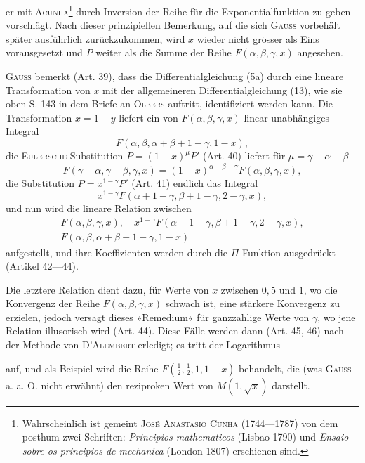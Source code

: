 er mit \textsc{Acunha}\footnote{Wahrscheinlich ist gemeint \textsc{José Anastasio Cunha} (1744—1787) von dem posthum zwei Schriften: \textit{Principios mathematicos} (Lisbao 1790) und \textit{Ensaio sobre os principios de mechanica} (London 1807) erschienen sind.} durch Inversion der Reihe für die Exponentialfunktion
zu geben vorschlägt. Nach dieser prinzipiellen Bemerkung, auf die sich \textsc{Gauss}
vorbehält später ausführlich zurückzukommen, wird \(x\) wieder nicht grösser als
Eins vorausgesetzt und \(P\) weiter als die Summe der Reihe \(F(\alpha,\beta,\gamma,x)\) angesehen.
\par
\textsc{Gauss} bemerkt (Art. 39), dass die Differentialgleichung (5a) durch eine
lineare Transformation von \(x\) mit der allgemeineren Differentialgleichung (13),
wie sie oben S. 143 in dem Briefe an \textsc{Olbers} auftritt, identifiziert werden
kann. Die Transformation \(x=1-y\) liefert ein von \(F(\alpha,\beta,\gamma,x)\) linear unabhängiges
Integral
\[
F(\alpha,\beta,\alpha+\beta+1-\gamma,1-x),
\]
die \textsc{Eulersche} Substitution \(P=(1-x)^\mu P'\) (Art. 40) liefert für \(\mu=\gamma-\alpha-\beta\)
\[
F(\gamma-\alpha,\gamma-\beta,\gamma,x)=(1-x)^{\alpha+\beta-\gamma}F(\alpha,\beta,\gamma,x),
\]
die Substitution \(P=x^{1-\gamma}P'\) (Art. 41) endlich das Integral
\[
x^{1-\gamma}F(\alpha+1-\gamma,\beta+1-\gamma,2-\gamma,x),
\]
und nun wird die lineare Relation zwischen
\[
\begin{gathered}
F(\alpha,\beta,\gamma,x),\quad x^{1-\gamma}F(\alpha+1-\gamma,\beta+1-\gamma,2-\gamma,x),\\
F(\alpha,\beta,\alpha+\beta+1-\gamma,1-x)
\end{gathered}
\]
aufgestellt, und ihre Koeffizienten werden durch die \(\Pi\)-Funktion ausgedrückt
(Artikel 42—44).
\par
Die letztere Relation dient dazu, für Werte von \(x\) zwischen \(0{,}5\) und \(1\),
wo die Konvergenz der Reihe \(F(\alpha,\beta,\gamma,x)\) schwach ist, eine stärkere Konvergenz
zu erzielen, jedoch versagt dieses »Remedium« für ganzzahlige Werte
von \(\gamma\), wo jene Relation illusorisch wird (Art. 44). Diese Fälle werden dann
(Art. 45, 46) nach der Methode von \textsc{D’Alembert} erledigt; es tritt der Logarithmus\par
\clearpage{}
\noindent auf, und als Beispiel wird die Reihe \(F(\tfrac12,\tfrac12,1,1-x)\) behandelt, die
(was \textsc{Gauss} a. a. O. nicht erwähnt) den reziproken Wert von \(M(1,\sqrt{x})\) darstellt.
